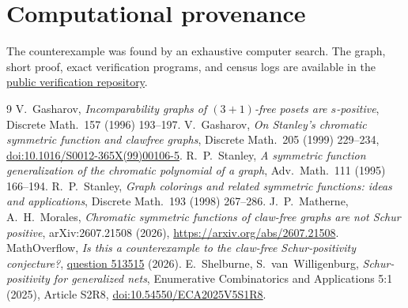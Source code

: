 \documentclass[11pt]{article}
\theoremstyle{remark}
\begin{document}
\section*{Computational provenance}
The counterexample was found by an exhaustive computer search. The graph,
short proof, exact verification programs, and census logs are available in
the
\href{https://github.com/infinityscroll/claw-free-schur-counterexample}
{public verification repository}.

\begin{thebibliography}{9}
 V.~Gasharov, \emph{Incomparability graphs of
$(3+1)$-free posets are $s$-positive}, Discrete Math.\ 157 (1996) 193--197.
 V.~Gasharov, \emph{On Stanley's chromatic symmetric
function and clawfree graphs}, Discrete Math.\ 205 (1999) 229--234,
\href{https://doi.org/10.1016/S0012-365X(99)00106-5}
{doi:10.1016/S0012-365X(99)00106-5}.
 R.~P.~Stanley, \emph{A symmetric function
generalization of the chromatic polynomial of a graph}, Adv.\ Math.\ 111
(1995) 166--194.
 R.~P.~Stanley, \emph{Graph colorings and related
symmetric functions: ideas and applications}, Discrete Math.\ 193 (1998)
267--286.
 J.~P.~Matherne, A.~H.~Morales, \emph{Chromatic symmetric
functions of claw-free graphs are not Schur positive}, arXiv:2607.21508
(2026), \url{https://arxiv.org/abs/2607.21508}.
 MathOverflow, \emph{Is this a counterexample to the claw-free
Schur-positivity conjecture?},
\href{https://mathoverflow.net/questions/513515/is-this-a-counterexample-to-the-claw-free-schur-positivity-conjecture}
{question 513515} (2026).
 E.~Shelburne, S.~van~Willigenburg,
\emph{Schur-positivity for generalized nets}, Enumerative Combinatorics and
Applications 5:1 (2025), Article S2R8,
\href{https://doi.org/10.54550/ECA2025V5S1R8}
{doi:10.54550/ECA2025V5S1R8}.
\end{thebibliography}
\end{document}
